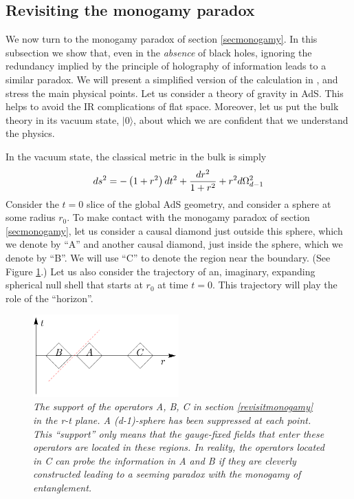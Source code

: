 \documentclass[12pt]{article}
\newcommand{\be}{\begin{equation}}
\newcommand{\ee}{\end{equation}}
\begin{document}
\subsection{Revisiting the monogamy paradox \label{revisitmonogamy}}
We now turn to the monogamy paradox of section \ref{secmonogamy}. In this subsection we show that, even in the {\em absence} of black holes, ignoring the redundancy implied by the principle of holography of information leads to a similar paradox.  We will present a simplified version of the calculation in \cite{Raju:2018zpn}, and stress the main physical points. Let us consider a theory of gravity in AdS. This helps to avoid the  IR complications of flat space. Moreover, let us put the bulk theory in its vacuum state, $|0 \rangle$, about which we are confident that we understand the physics.  

In the vacuum state, the classical metric in the bulk is simply
\be
\label{emptyglobalads}
ds^2 = -\left(1+r^2\right) dt^2  +{ dr^2 \over 1+r^2} + r^2 d\Omega_{d-1}^2 
\ee
Consider the $t = 0$ slice of the global AdS geometry, and consider a sphere at some radius $r_0$.  To make contact with the monogamy paradox of section \ref{secmonogamy}, let us consider a causal diamond just outside this sphere, which we denote by ``A'' and another causal diamond, just inside the sphere,  which we denote by  ``B''. We will use ``C'' to denote the region near the boundary. (See Figure \ref{monogsupport}.) Let us also consider the trajectory of an, imaginary, expanding spherical null shell that starts at $r_0$ at time $t = 0$. This trajectory  will play the role of the ``horizon''. 
\begin{figure}[!ht]
\begin{center}
\includegraphics[width=0.5\textwidth]{toydiagram.pdf}
\caption{\em The support of the operators A, B, C in section \ref{revisitmonogamy} in the r-t plane. A (d-1)-sphere has been suppressed at each point. This ``support'' only means that the gauge-fixed fields that enter these operators are located in these regions. In reality, the operators located in C can probe the information in A and B if they are cleverly constructed leading to a seeming paradox with the monogamy of entanglement. \label{monogsupport}}
\end{center}
\end{figure}
\end{document}
